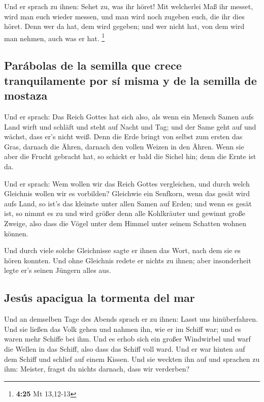  Und er sprach zu ihnen: Sehet zu, was ihr höret! Mit
welcherlei Maß ihr messet, wird man euch wieder messen, und man wird
noch zugeben euch, die ihr dies höret.  Denn wer da hat,
dem wird gegeben; und wer nicht hat, von dem wird man nehmen, auch was
er hat. \footnote{\textbf{4:25} Mt 13,12-13}

\hypertarget{paruxe1bolas-de-la-semilla-que-crece-tranquilamente-por-suxed-misma-y-de-la-semilla-de-mostaza}{%
\subsection{Parábolas de la semilla que crece tranquilamente por sí
misma y de la semilla de
mostaza}\label{paruxe1bolas-de-la-semilla-que-crece-tranquilamente-por-suxed-misma-y-de-la-semilla-de-mostaza}}

 Und er sprach: Das Reich Gottes hat sich also, als wenn
ein Mensch Samen aufs Land wirft  und schläft und steht
auf Nacht und Tag; und der Same geht auf und wächst, dass er's nicht
weiß.  Denn die Erde bringt von selbst zum ersten das
Gras, darnach die Ähren, darnach den vollen Weizen in den Ähren.
 Wenn sie aber die Frucht gebracht hat, so schickt er
bald die Sichel hin; denn die Ernte ist da.

 Und er sprach: Wem wollen wir das Reich Gottes
vergleichen, und durch welch Gleichnis wollen wir es vorbilden?
 Gleichwie ein Senfkorn, wenn das gesät wird aufs Land,
so ist's das kleinste unter allen Samen auf Erden;  und
wenn es gesät ist, so nimmt es zu und wird größer denn alle Kohlkräuter
und gewinnt große Zweige, also dass die Vögel unter dem Himmel unter
seinem Schatten wohnen können.

 Und durch viele solche Gleichnisse sagte er ihnen das
Wort, nach dem sie es hören konnten.  Und ohne Gleichnis
redete er nichts zu ihnen; aber insonderheit legte er's seinen Jüngern
alles aus.

\hypertarget{jesuxfas-apacigua-la-tormenta-del-mar}{%
\subsection{Jesús apacigua la tormenta del
mar}\label{jesuxfas-apacigua-la-tormenta-del-mar}}

 Und an demselben Tage des Abends sprach er zu ihnen:
Lasst uns hinüberfahren.  Und sie ließen das Volk gehen
und nahmen ihn, wie er im Schiff war; und es waren mehr Schiffe bei ihm.
 Und es erhob sich ein großer Windwirbel und warf die
Wellen in das Schiff, also dass das Schiff voll ward. 
Und er war hinten auf dem Schiff und schlief auf einem Kissen. Und sie
weckten ihn auf und sprachen zu ihm: Meister, fragst du nichts darnach,
dass wir verderben?

